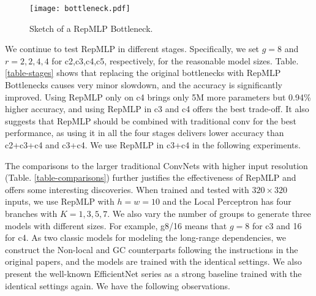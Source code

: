 \documentclass[10pt,twocolumn,letterpaper]{article}
\begin{document}
\begin{figure}
	\begin{center}
		\texttt{[image: bottleneck.pdf]}
		\vspace{-0.20in}
		\caption{Sketch of a RepMLP Bottleneck.}
		\label{fig-repmlp-resnet}
		\vspace{-0.3in}
	\end{center}
\end{figure}



We continue to test RepMLP in different stages. Specifically, we set $g=8$ and $r=2,2,4,4$ for c2,c3,c4,c5, respectively, for the reasonable model sizes. Table. \ref{table-stages} shows that replacing the original bottlenecks with RepMLP Bottlenecks causes very minor slowdown, and the accuracy is significantly improved. Using RepMLP only on c4 brings only 5M more parameters but 0.94\% higher accuracy, and using RepMLP in c3 and c4 offers the best trade-off. It also suggests that RepMLP should be combined with traditional conv for the best performance, as using it in all the four stages delivers lower accuracy than c2+c3+c4 and c3+c4. We use RepMLP in c3+c4 in the following experiments.

The comparisons to the larger traditional ConvNets with higher input resolution (Table. \ref{table-comparisons}) further justifies the effectiveness of RepMLP and offers some interesting discoveries. When trained and tested with $320\times320$ inputs, we use RepMLP with $h=w=10$ and the Local Perceptron has four branches with $K=1,3,5,7$. We also vary the number of groups to generate three models with different sizes. For example, g8/16 means that $g=8$ for c3 and 16 for c4. As two classic models for modeling the long-range dependencies, we construct the Non-local \cite{wang2018non} and GC \cite{cao2019gcnet} counterparts following the instructions in the original papers, and the models are trained with the identical settings. We also present the well-known EfficientNet \cite{efficientnet} series as a strong baseline trained with the identical settings again. We have the following observations.
\end{document}

